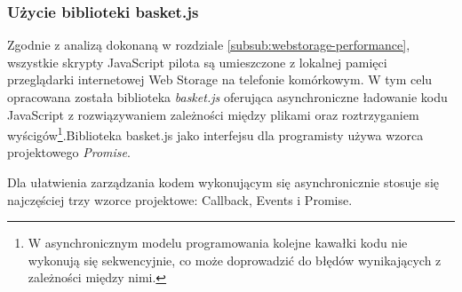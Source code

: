 \subsubsection{Użycie biblioteki basket.js}
\label{subsub:tools-basketjs}

Zgodnie z analizą dokonaną w rozdziale \ref{subsub:webstorage-performance}, wszystkie skrypty JavaScript pilota są umieszczone z lokalnej pamięci przeglądarki internetowej Web Storage na telefonie komórkowym. W tym celu opracowana została biblioteka \emph{basket.js} oferująca asynchroniczne ładowanie kodu JavaScript z rozwiązywaniem zależności między plikami oraz roztrzyganiem wyścigów\footnote{W asynchronicznym modelu programowania kolejne kawałki kodu nie wykonują się sekwencyjnie, co może doprowadzić do błędów wynikających z zależności między nimi.}.Biblioteka basket.js jako interfejsu dla programisty używa wzorca projektowego \emph{Promise}.

Dla ułatwienia zarządzania kodem wykonującym się asynchronicznie stosuje się najczęściej trzy wzorce projektowe: Callback, Events i Promise.

